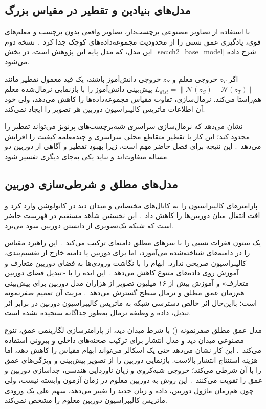 \subsection{مدل‌های بنیادین و تقطیر در مقیاس بزرگ}
 با استفاده از تصاویر مصنوعی برچسب‌دار، تصاویر واقعی بدون برچسب و معلم‌های قوی، یادگیری عمق نسبی را از محدودیت مجموعه‌داده‌های کوچک جدا کرد~\cite{Yang2024DepthAnything}. نسخه دوم این مدل، که مدل پایه این پژوهش است، در بخش~\ref{sec:ch2_base_model} شرح داده می‌شود.

اگر $z_T$ خروجی معلم و $z_S$ خروجی دانش‌آموز باشند، یک قید معمول تقطیر مانند $L_{dist}=\lVert \mathcal N(z_S)-\mathcal N(z_T)\rVert$ پیش‌بینی دانش‌آموز را با بازنمایی نرمال‌شده معلم هم‌راستا می‌کند. نرمال‌سازی، تفاوت مقیاس مجموعه‌داده‌ها را کاهش می‌دهد، ولی خود آن اطلاعات ماتریس کالیبراسیون دوربین هر تصویر را ایجاد نمی‌کند.

 نشان می‌دهد که نرمال‌سازی سراسری شبه‌برچسب‌های پرنویز می‌تواند تقطیر را محدود کند؛ این کار با تقطیر متقاطع محلی سراسری و چندمعلمه کیفیت را افزایش می‌دهد~\cite{DistillAnyDepth}. این نتیجه برای فصل حاضر مهم است، زیرا بهبود تقطیر و آگاهی از دوربین دو مساله متفاوت‌اند و نباید یکی به‌جای دیگری تفسیر شود.

\subsection{مدل‌های مطلق و شرطی‌سازی دوربین}
 پارامترهای کالیبراسیون را به کانال‌های مختصاتی و میدان دید در کانولوشن وارد کرد و افت انتقال میان دوربین‌ها را کاهش داد~\cite{Facil2019CAMConvs}. این نخستین شاهد مستقیم در فهرست حاضر است که شبکه تک‌تصویری از دانستن دوربین سود می‌برد.

 یک ستون فقرات نسبی را با سرهای مطلق دامنه‌ای ترکیب می‌کند~\cite{Bhat2023ZoeDepth}. این راهبرد مقیاس را در دامنه‌های شناخته‌شده می‌آموزد، اما برای دوربین یا دامنه خارج از تقسیم‌بندی، کالیبراسیون صریحی ندارد.
 ابهام را با نگاشت ورودی‌ها به فضای دوربین متعارف و آموزش روی داده‌های متنوع کاهش می‌دهد~\cite{Yin2023Metric3D}.  این ایده را با «تبدیل فضای دوربین متعارف» و آموزش بیش از ۱۶ میلیون تصویر از هزاران مدل دوربین برای پیش‌بینی هم‌زمان عمق مطلق و نرمال سطح گسترش می‌دهد~\cite{Metric3Dv2}. مزیت آن تعمیم صفرنمونه است؛ بااین‌حال اثر خالص دسترسی شبکه به ماتریس کالیبراسیون دوربین در برابر اثر تبدیل، داده و وظیفه نرمال به‌طور جداگانه سنجیده نشده است.

مدل عمق مطلق صفرنمونه () با شرط میدان دید، از پارامترسازی لگاریتمی عمق، تنوع مصنوعی میدان دید و مدل انتشار برای ترکیب صحنه‌های داخلی و بیرونی استفاده می‌کند~\cite{Saxena2023FOV}. این کار نشان می‌دهد حتی یک اسکالر  می‌تواند ابهام مقیاس را کاهش دهد، اما هزینه استنتاج انتشار بالاست.
 بازنمایی دوربین را از تصویر پیش‌بینی و ویژگی‌های عمق را با آن شرطی می‌کند؛ خروجی شبه‌کروی و زیان ناوردایی هندسی، جداسازی دوربین و عمق را تقویت می‌کنند~\cite{Piccinelli2024UniDepth}. این روش به دوربین معلوم در زمان آزمون وابسته نیست، ولی چون هم‌زمان ماژول دوربین، داده و زیان جدید را تغییر می‌دهد، سهم علی یک ورودی ماتریس کالیبراسیون دوربین معلوم را مشخص نمی‌کند.

